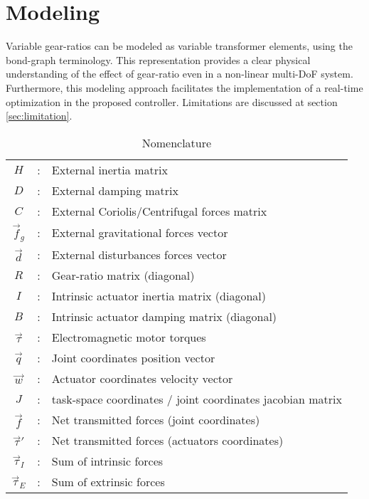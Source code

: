 \section{Modeling}
\label{sec:model}


Variable gear-ratios can be modeled as variable transformer elements, using the bond-graph terminology. This representation provides a clear physical understanding of the effect of gear-ratio even in a non-linear multi-DoF system. Furthermore, this modeling approach facilitates the implementation of a real-time optimization in the proposed controller. Limitations are discussed at section \ref{sec:limitation}.

\begin{table}[htbp]
	\centering
		\begin{tabular}{ c c l }
		
        \hline \hline
			$H$             &  :  & External inertia matrix \\
			$D$             &  :  & External damping matrix \\
			$C$             &  :  & External Coriolis/Centrifugal forces matrix  \\
			$\vec{f}_g$     &  :  & External gravitational forces vector  \\
			$\vec{d  }$     &  :  & External disturbances forces vector  \\
			$R$             &  :  & Gear-ratio matrix (diagonal) \\
			$I$             &  :  & Intrinsic actuator inertia matrix (diagonal) \\
			$B$             &  :  & Intrinsic actuator damping matrix (diagonal) \\
			$\vec{\tau}$    &  :  & Electromagnetic motor torques  \\
			$\vec{q}$       &  :  & Joint coordinates position vector  \\
			$\vec{w}$       &  :  & Actuator coordinates velocity vector  \\
			$J$             &  :  & task-space coordinates / joint coordinates jacobian matrix\\
			$\vec{f}$       &  :  & Net transmitted forces (joint coordinates) \\
			$\vec{\tau}'$   &  :  & Net transmitted forces (actuators coordinates) \\
			$\vec{\tau}_I$  &  :  & Sum of intrinsic forces  \\
			$\vec{\tau}_E$  &  :  & Sum of extrinsic forces  \\
		\hline \hline
        \end{tabular}		
        \caption{Nomenclature}	%
		
	\label{tab:nom}
\end{table}


